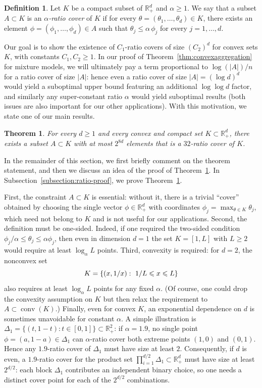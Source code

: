 \documentclass[11pt]{article}
\newcommand{\R}{\mathbb R}
\renewcommand{\leq}{\leqslant}
\renewcommand{\geq}{\geqslant}
\renewcommand{\le}{\leqslant}
\renewcommand{\ge}{\geqslant}
\newcommand{\conv}{\mathop{\mathrm{conv}}}
\newtheorem{theorem}{Theorem}
\theoremstyle{definition}
\newtheorem{definition}{Definition}
\theoremstyle{remark}
\DeclarePairedDelimiter{\set}{\{}{\}}
\begin{document}
\begin{definition}
  \label{def:ratio-cover}
  Let $K$ be a compact subset of $\R_+^d$ and $\alpha \geq 1$.
  We say that a subset $A \subset K$ is an \emph{$\alpha$-ratio cover} of $K$ if for every $\theta = (\theta_1, \dots, \theta_d) \in K$, there exists an element $\phi = (\phi_1, \dots, \phi_d) \in A$ such that $\theta_j \leq \alpha \, \phi_j$ for every $j=1, \dots, d$.
\end{definition}

Our goal is to show the existence of $C_1$-ratio covers of size $(C_2)^d$ for convex sets $K$, with constants $C_1,C_2\ge 1$. In our proof of Theorem~\ref{thm:convexaggregation} for mixture models, we will ultimately pay a term proportional to $\log(|A|)/n$ for a ratio cover of size $|A|$: hence even a ratio cover of size $|A|=(\log d)^d$ would yield a suboptimal upper bound featuring an additional $\log \log d$ factor, and similarly any super-constant ratio $\alpha$ would yield suboptimal results (both issues are also important for our other applications). With this motivation, we state one of our main results.

\begin{theorem}
\label{thm:ratio-cover}
For every $d \geq 1$ and every convex and compact set
$K \subset \R_+^d$, there exists a subset $A \subset K$
with at most $2^{8d}$ elements that is a $32$-ratio cover of $K$.
\end{theorem}


In the remainder of this section, we first briefly comment on the theorem statement, and then we discuss an idea of the proof of Theorem~\ref{thm:ratio-cover}. In Subsection~\ref{subsection:ratio-proof}, we prove Theorem~\ref{thm:ratio-cover}.

First, the constraint $A\subset K$ is essential: without it, there is a trivial ``cover'' obtained by choosing the single vector
$\phi\in\R_+^d$ with coordinates $\phi_j=\max_{\theta\in K}\theta_j$, which need not belong to $K$ and is not useful for our applications. Second, the definition must be one-sided. Indeed, if one required the two-sided condition $\phi_j/\alpha \le \theta_j \le \alpha\phi_j$, then even in dimension $d=1$ the set $K=[1,L]$ with $L\ge 2$ would require at least $\log_\alpha L$ points. Third, convexity is required: for $d=2$, the nonconvex set
\[
K=\set{(x,1/x):\ 1/L\le x\le L}
\]
also requires at least $\log_\alpha L$ points for any fixed $\alpha$.
(Of course, one could drop the convexity assumption on $K$ but then relax the requirement to $A \subset \conv (K)$.)
Finally, even for convex $K$, an exponential dependence on $d$ is sometimes unavoidable for constant $\alpha$.
A simple illustration is $\Delta_1=\{(t,1-t):t\in[0,1]\}\subset\R_+^2$: if $\alpha = 1.9$, no single point $\phi=(a,1-a)\in\Delta_1$ can $\alpha$-ratio cover both extreme points $(1,0)$ and $(0,1)$. Hence any $1.9$-ratio cover of $\Delta_1$ must have size at least $2$. Consequently, if $d$ is even, a $1.9$-ratio cover for the product set $\prod_{i=1}^{d/2}\Delta_1\subset\R_+^d$ must have size at least $2^{d/2}$: each block $\Delta_1$ contributes an independent binary choice, so one needs a distinct cover point for each of the $2^{d/2}$ combinations.
\end{document}
